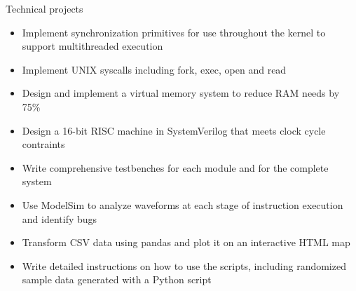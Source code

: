 \documentclass{resume} %
\begin{document}
\begin{workSection}{Technical projects}
     \customItem[
        title=Operating System Kernel,
        duration=September 2023 - December 2023,
        keyHighlight=Complete an implementation of an OS kernel using C and MIPS architecture
     ]
     \begin{itemize}
        \vspace{-0.5em}
        \itemsep -6pt {}
        \item Implement synchronization primitives for use throughout the kernel to support multithreaded execution
        \item Implement UNIX syscalls including fork, exec, open and read
        \item Design and implement a virtual memory system to reduce RAM needs by 75\%
     \end{itemize}

     \customItem[
        title=RISC Machine,
        duration=October 2022 - December 2022,
        keyHighlight=Use SystemVerilog to design and test a RISC machine that can execute a subset of the ARM ISA
     ]
     \begin{itemize}
        \vspace{-0.5em}
        \itemsep -6pt {}
        \item Design a 16-bit RISC machine in SystemVerilog that meets clock cycle contraints
        \item Write comprehensive testbenches for each module and for the complete system
        \item Use ModelSim to analyze waveforms at each stage of instruction execution and identify bugs
    \end{itemize}

    \customItem[
        title=Compass Card Data Modelling,
        duration=February 2024,
        keyHighlight=Write Python scripts to transform CSV data downloaded from \href{https://www.translink.ca/about-us/doing-business-with-translink/app-developer-resources/gtfs/gtfs-data}{Translink} into an interactive map
    ]
    \begin{itemize}
        \vspace{-0.5em}
        \itemsep -6pt {}
        \item Transform CSV data using pandas and plot it on an interactive HTML map
        \item Write detailed instructions on how to use the scripts, including randomized sample data generated with a Python script
    \end{itemize}


\end{workSection}
\end{document}
